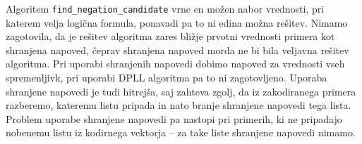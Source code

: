 \documentclass[12pt,a4paper,twoside]{article}
\theoremstyle{definition} %
\theoremstyle{plain} %
\numberwithin{equation}{section}  %
\begin{document}
Algoritem \texttt{find\_\-negation\_\-candidate} vrne en možen nabor vrednosti, pri katerem velja logična formula, ponavadi pa to ni edina možna rešitev.
Nimamo zagotovila, da je rešitev algoritma zares bližje prvotni vrednosti primera kot shranjena napoved, čeprav shranjena napoved morda ne bi bila veljavna rešitev algoritma.
Pri uporabi shranjenih napovedi dobimo napoved za vrednosti vseh spremenljivk, pri uporabi DPLL algoritma pa to ni zagotovljeno.
Uporaba shranjene napovedi je tudi hitrejša, saj zahteva zgolj, da iz zakodiranega primera razberemo, kateremu listu pripada in nato branje shranjene napovedi tega lista.
Problem uporabe shranjene napovedi pa nastopi pri primerih, ki ne pripadajo nobenemu listu iz kodirnega vektorja -- za take liste shranjene napovedi nimamo.
\end{document}
